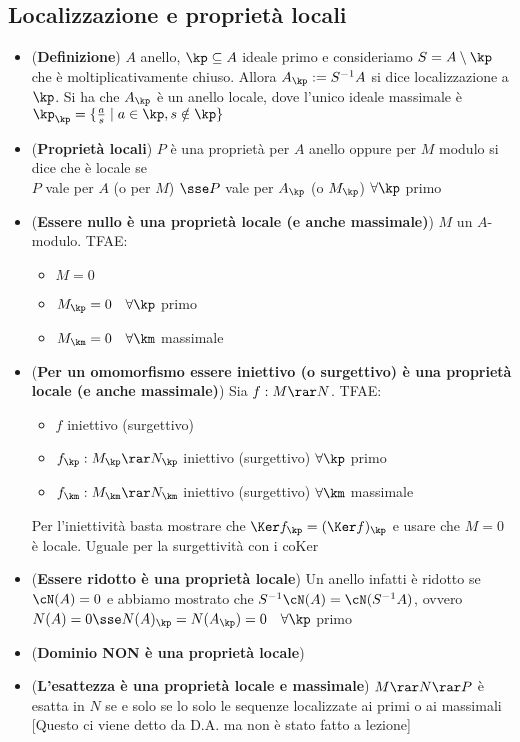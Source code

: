 \documentclass[a4paper,NoNotes,GeneralMath]{stdmdoc}
\newcommand{\coKer}{\text{coKer }}
\begin{document}
	\subsection*{Localizzazione e proprietà locali}
	\begin{itemize}
		\item ({\bf Definizione}) $A$ anello, $\kp \subseteq A$ ideale primo e consideriamo $S = A \setminus \kp$ che è moltiplicativamente chiuso. Allora $A_\kp := S^{-1}A$ si dice localizzazione a $\kp$. Si ha che $A_\kp$ è un anello locale, dove l'unico ideale massimale è $\kp_\kp = \{ \frac{a}{s} \mid a \in \kp, s \notin \kp \}$
		\item ({\bf Proprietà locali}) $P$ è una proprietà per $A$ anello oppure per $M$ modulo si dice che è locale se \\
			$P$ vale per $A$ (o per $M$) $\sse P$ vale per $A_\kp$ (o $M_\kp$) $\forall \kp$ primo
		\item ({\bf Essere nullo è una proprietà locale (e anche massimale)}) $M$ un $A$-modulo. TFAE:
			\begin{itemize}
				\item $M = 0$
				\item $M_\kp = 0 \quad \forall \kp$ primo
				\item $M_\km = 0 \quad \forall \km$ massimale
			\end{itemize}
		\item ({\bf Per un omomorfismo essere iniettivo (o surgettivo) è una proprietà locale (e anche massimale)}) Sia $f: M \rar N$. TFAE:
			\begin{itemize}
				\item $f$ iniettivo (surgettivo)
				\item $f_\kp: M_\kp \rar N_\kp$ iniettivo (surgettivo) $\forall \kp$ primo
				\item $f_\km: M_\km \rar N_\km$ iniettivo (surgettivo) $\forall \km$ massimale
			\end{itemize}
			Per l'iniettività basta mostrare che $\Ker f_\kp = (\Ker f)_\kp$ e usare che $M = 0$ è locale. Uguale per la surgettività con i $\coKer$
		\item ({\bf Essere ridotto è una proprietà locale}) Un anello infatti è ridotto se $\cN(A) = 0$ e abbiamo mostrato che $S^{-1}\cN(A) = \cN(S^{-1}A)$, ovvero $N(A) = 0 \sse N(A)_\kp = N(A_\kp) = 0 \quad \forall \kp$ primo
		\item ({\bf Dominio NON è una proprietà locale})
		\item ({\bf L'esattezza è una proprietà locale e massimale}) $M \rar N \rar P$ è esatta in $N$ se e solo se lo solo le sequenze localizzate ai primi o ai massimali [Questo ci viene detto da D.A. ma non è stato fatto a lezione]
	\end{itemize}
	
\end{document}

